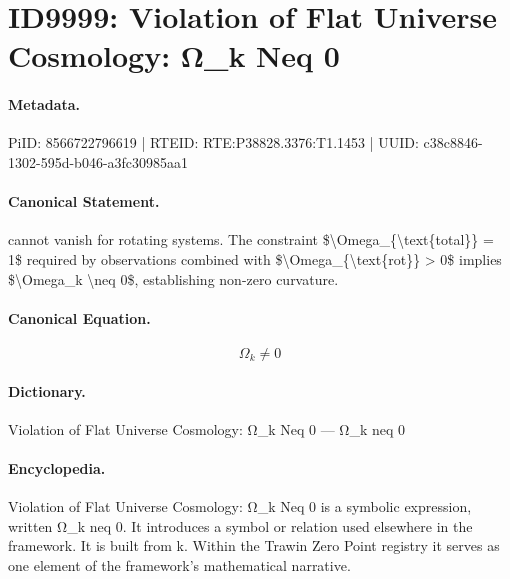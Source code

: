 \section*{ID9999: Violation of Flat Universe Cosmology: Ω\_k Neq 0}
\paragraph{Metadata.}
PiID: 8566722796619 | RTEID: RTE:P38828.3376:T1.1453 | UUID: c38c8846-1302-595d-b046-a3fc30985aa1

\paragraph{Canonical Statement.}
cannot vanish for rotating systems. The constraint \$\textbackslash{}Omega\_\{\textbackslash{}text\{total\}\} = 1\$ required by observations combined with \$\textbackslash{}Omega\_\{\textbackslash{}text\{rot\}\} > 0\$ implies \$\textbackslash{}Omega\_k \textbackslash{}neq 0\$, establishing non-zero curvature.

\paragraph{Canonical Equation.}
\[
\Omega_k \neq 0
\]

\paragraph{Dictionary.}
Violation of Flat Universe Cosmology: Ω\_k Neq 0 — Ω\_k neq 0

\paragraph{Encyclopedia.}
Violation of Flat Universe Cosmology: Ω\_k Neq 0 is a symbolic expression, written Ω\_k neq 0. It introduces a symbol or relation used elsewhere in the framework. It is built from k. Within the Trawin Zero Point registry it serves as one element of the framework's mathematical narrative.
